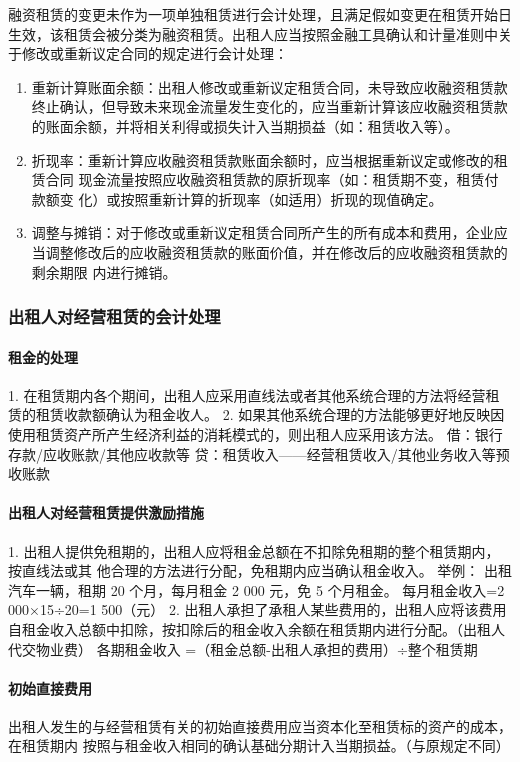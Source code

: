 \documentclass[UTF8,12pt]{ctexart}
\numberwithin{equation}{section} %
\numberwithin{figure}{section}
\numberwithin{table}{section}
\begin{document}
	融资租赁的变更未作为一项单独租赁进行会计处理，且满足假如变更在租赁开始日生效，该租赁会被分类为融资租赁。出租人应当按照金融工具确认和计量准则中关于修改或重新议定合同的规定进行会计处理：
	\begin{enumerate}
		\item 重新计算账面余额：出租人修改或重新议定租赁合同，未导致应收融资租赁款终止确认，但导致未来现金流量发生变化的，应当重新计算该应收融资租赁款的账面余额，并将相关利得或损失计入当期损益（如：租赁收入等）。
		
		\item 折现率：重新计算应收融资租赁款账面余额时，应当根据重新议定或修改的租赁合同  现金流量按照应收融资租赁款的原折现率（如：租赁期不变，租赁付款额变
		化）或按照重新计算的折现率（如适用）折现的现值确定。
		
		\item 调整与摊销：对于修改或重新议定租赁合同所产生的所有成本和费用，企业应当调整修改后的应收融资租赁款的账面价值，并在修改后的应收融资租赁款的剩余期限
		内进行摊销。
	\end{enumerate}
	
	\subsubsection{出租人对经营租赁的会计处理}
	\paragraph{租金的处理}1.	在租赁期内各个期间，出租人应采用直线法或者其他系统合理的方法将经营租赁的租赁收款额确认为租金收人。
	2.	如果其他系统合理的方法能够更好地反映因使用租赁资产所产生经济利益的消耗模式的，则出租人应采用该方法。
	借：银行存款/应收账款/其他应收款等
	贷：租赁收入——经营租赁收入/其他业务收入等预收账款
	
	\paragraph{出租人对经营租赁提供激励措施}1.	出租人提供免租期的，出租人应将租金总额在不扣除免租期的整个租赁期内，按直线法或其   他合理的方法进行分配，免租期内应当确认租金收入。
	举例：
	出租汽车一辆，租期 20 个月，每月租金 2 000 元，免 5 个月租金。
	每月租金收入=2 000×15÷20=1 500（元）
	2.	出租人承担了承租人某些费用的，出租人应将该费用自租金收入总额中扣除，按扣除后的租金收入余额在租赁期内进行分配。（出租人代交物业费）
	各期租金收入
	=（租金总额-出租人承担的费用）÷整个租赁期
	
	\paragraph{初始直接费用}出租人发生的与经营租赁有关的初始直接费用应当资本化至租赁标的资产的成本，在租赁期内
	按照与租金收入相同的确认基础分期计入当期损益。（与原规定不同）
	
\end{document}
